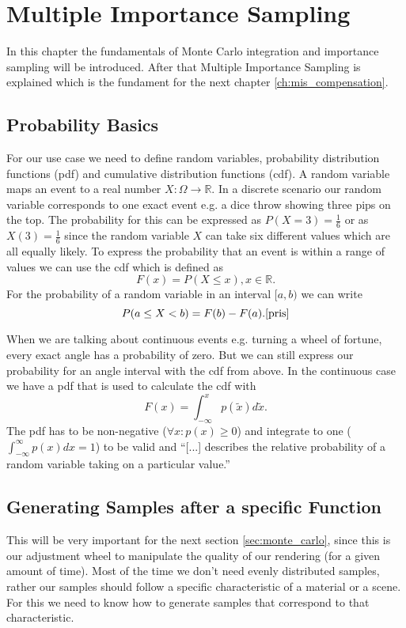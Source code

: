 \chapter{Multiple Importance Sampling}
\label{ch:mis}

In this chapter the fundamentals of Monte Carlo integration and importance sampling will be introduced.
After that Multiple Importance Sampling is explained which is the fundament for the next chapter \ref{ch:mis_compensation}.


\section{Probability Basics}
\label{sec:probability_basics}

For our use case we need to define random variables, probability distribution functions (pdf) and cumulative distribution functions (cdf).
A random variable maps an event to a real number $ X: \Omega \to \mathbb{R} $.
In a discrete scenario our random variable corresponds to one exact event e.g. a dice throw showing three pips on the top.
The probability for this can be expressed as $ P(X = 3) = \frac{1}{6} $ or as $ X(3) = \frac{1}{6} $
since the random variable $ X $ can take six different values which are all equally likely.
To express the probability that an event is within a range of values we can use the cdf
which is defined as $$ F(x) = P(X \leq x), x \in \mathbb{R}. $$
For the probability of a random variable in an interval $ [a, b) $ we can write $$ P(a \leq X < b) = F(b) - F(a). \cite{pris} $$

When we are talking about continuous events e.g. turning a wheel of fortune, every exact angle has a probability of zero.
But we can still express our probability for an angle interval with the cdf from above.
In the continuous case we have a pdf that is used to calculate the cdf with $$ F(x) = \int_{-\infty}^x p(\tilde{x}) d\tilde{x}. $$
The pdf has to be non-negative ($ \forall x: p(x) \geq 0 $) and integrate to one ($ \int_{-\infty}^{\infty} p(x) dx = 1$) to be valid and
\enquote{[...] describes the relative probability of a random variable taking on a particular value.}\cite[Chapter~13.1]{pbr-book}


\section{Generating Samples after a specific Function}
\label{sec:sample_generation}
This will be very important for the next section \ref{sec:monte_carlo},
since this is our adjustment wheel to manipulate the quality of our rendering (for a given amount of time).
Most of the time we don't need evenly distributed samples,
rather our samples should follow a specific characteristic of a material or a scene.
For this we need to know how to generate samples that correspond to that characteristic.

